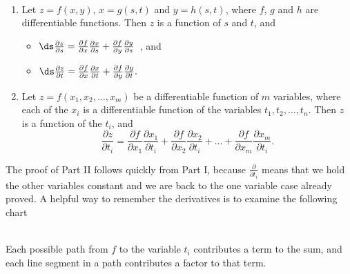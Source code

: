 \begin{theorem}\label{thm:multi_chain2}%
%
\mbox{}\\[-2\baselineskip]\parbox[t]{\linewidth}{%
\begin{enumerate}
	\item Let $z=f(x,y)$, $x=g(s,t)$ and $y=h(s,t)$, where $f$, $g$ and $h$ are differentiable functions. Then $z$ is a function of $s$ and $t$, and
	\begin{itemize}
		\item $\ds \frac{\partial z}{\partial s} = \frac{\partial f}{\partial x}\frac{\partial x}{\partial s} + \frac{\partial f}{\partial y}\frac{\partial y}{\partial s}$\ , \quad and 
		\item $\ds \frac{\partial z}{\partial t} = \frac{\partial f}{\partial x}\frac{\partial x}{\partial t} + \frac{\partial f}{\partial y}\frac{\partial y}{\partial t}.$
	\end{itemize}
		
	\item Let $z = f(x_1,x_2,\dots,x_m)$ be a differentiable function of $m$ variables, where each of the $x_i$ is a differentiable function of the variables $t_1,t_2,\dots,t_n$. Then $z$ is a function of the $t_i$, and 
	\[\frac{\partial z}{\partial t_i} = \frac{\partial f}{\partial x_1}\frac{\partial x_1}{\partial t_i} + \frac{\partial f}{\partial x_2}\frac{\partial x_2}{\partial t_i} + \dots +  \frac{\partial f}{\partial x_m}\frac{\partial x_m}{\partial t_i}.\]
\end{enumerate}}
\end{theorem}

The proof of Part II follows quickly from Part I, because $\frac\partial{\partial t_i}$ means that we hold the other variables constant and we are back to the one variable case already proved.  A helpful way to remember the derivatives is to examine the following chart\\
\noindent\begin{minipage}[t]{\linewidth}\noindent%
\captionsetup{type=figure}%
\centering
{}
\end{minipage}\\
Each possible path from $f$ to the variable $t_i$ contributes a term to the sum, and each line segment in a path contributes a factor to that term.

